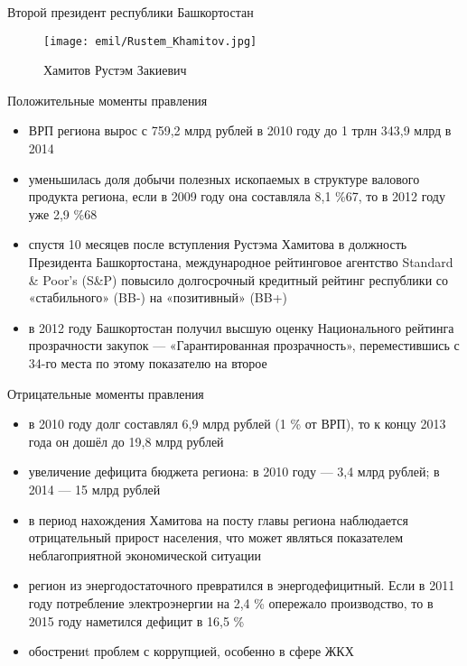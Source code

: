 \begin{frame}{Второй президент республики Башкортостан}

\begin{figure}[h!]
	\begin{center}
		{\texttt{[image: emil/Rustem\_Khamitov.jpg]}}
		\caption{Хамитов Рустэм Закиевич}
	\end{center}
\end{figure}

\end{frame}

\begin{frame}{Положительные моменты правления}

\begin{itemize}
	\item  ВРП региона вырос с 759,2 млрд рублей в 2010 году до 1 трлн 343,9 млрд в 2014
	\item уменьшилась доля добычи полезных ископаемых в структуре валового продукта региона, если в 2009 году она составляла 8,1 \%67, то в 2012 году уже 2,9 \%68
	\item спустя 10 месяцев после вступления Рустэма Хамитова в должность Президента Башкортостана, международное рейтинговое агентство Standard & Poor’s (S&P) повысило долгосрочный кредитный рейтинг республики со «стабильного» (BB-) на «позитивный» (BB+)
	\item в 2012 году Башкортостан получил высшую оценку Национального рейтинга прозрачности закупок — «Гарантированная прозрачность», переместившись с 34-го места по этому показателю на второе
\end{itemize}

\end{frame}

\begin{frame}{Отрицательные моменты правления}

\begin{itemize}
	\item  в 2010 году долг составлял 6,9 млрд рублей (1 \% от ВРП), то к концу 2013 года он дошёл до 19,8 млрд рублей
	\item увеличение дефицита бюджета региона: в 2010 году — 3,4 млрд рублей; в 2014 — 15 млрд рублей
	\item  в период нахождения Хамитова на посту главы региона наблюдается отрицательный прирост населения, что может являться показателем неблагоприятной экономической ситуации
	\item регион из энергодостаточного превратился в энергодефицитный. Если в 2011 году потребление электроэнергии на 2,4 \% опережало производство, то в 2015 году наметился дефицит в 16,5 \%
	\item обострениt проблем с коррупцией, особенно в сфере ЖКХ
\end{itemize}

\end{frame}

